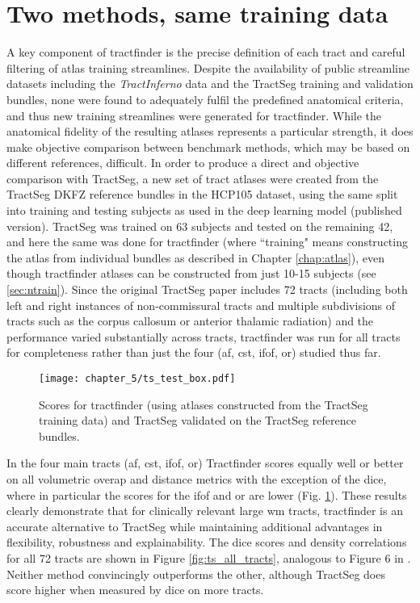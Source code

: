 \section{Two methods, same training data}\label{sec:tractseg}

A key component of tractfinder is the precise definition of each tract and careful filtering of atlas training streamlines.
Despite the availability of public streamline datasets including the \textit{TractInferno} data and the TractSeg training and validation bundles, none were found to adequately fulfil the predefined anatomical criteria, and thus new training streamlines were generated for tractfinder.
While the anatomical fidelity of the resulting atlases represents a particular strength, it does make objective comparison between benchmark methods, which may be based on different references, difficult.
In order to produce a direct and objective comparison with TractSeg, a new set of tract atlases were created from the TractSeg DKFZ reference bundles\autocite{Wasserthal2018b} in the HCP105 dataset, using the same split into training and testing subjects as used in the deep learning model (published version).
TractSeg was trained on 63 subjects and tested on the remaining 42, and here the same was done for tractfinder (where ``training" means constructing the atlas from individual bundles as described in Chapter \ref{chap:atlas}), even though tractfinder atlases can be constructed from just 10-15 subjects (see \ref{sec:ntrain}).
Since the original TractSeg paper includes 72 tracts (including both left and right instances of non-commissural tracts and multiple subdivisions of tracts such as the corpus callosum or anterior thalamic radiation) and the performance varied substantially across tracts, tractfinder was run for all tracts for completeness rather than just the four (\gls{af}, \gls{cst}, \gls{ifof}, \gls{or}) studied thus far.

\begin{figure}[htb!]
  \texttt{[image: chapter\_5/ts\_test\_box.pdf]}
  \caption{Scores for tractfinder (using atlases constructed from the TractSeg training data) and TractSeg validated on the TractSeg reference bundles.}
  \label{fig:ts_atlas}
\end{figure}

In the four main tracts (\gls{af}, \gls{cst}, \gls{ifof}, \gls{or}) Tractfinder scores equally well or better on all volumetric overap and distance metrics with the exception of the \gls{dice}, where in particular the scores for the \gls{ifof} and \gls{or} are lower (Fig. \ref{fig:ts_atlas}).
These results clearly demonstrate that for clinically relevant large \gls{wm} tracts, tractfinder is an accurate alternative to TractSeg while maintaining additional advantages in flexibility, robustness and explainability.
The \gls{dice} scores and density correlations for all 72 tracts are shown in Figure \ref{fig:ts_all_tracts}, analogous to Figure 6 in \textcite{Wasserthal2018}.
Neither method convincingly outperforms the other, although TractSeg does score higher when measured by \gls{dice} on more tracts.

